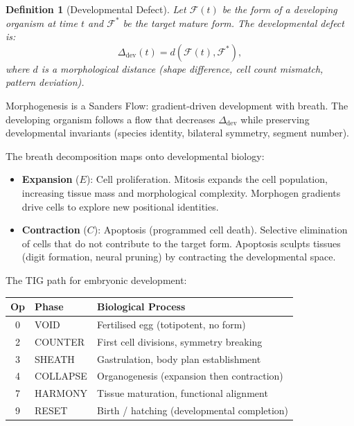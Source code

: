 \documentclass[12pt, openany]{book}
\newtheorem{definition}[theorem]{Definition}
\theoremstyle{remark}
\begin{document}
\begin{definition}[Developmental Defect]
\label{def:dev-defect}
Let $\mathcal{F}(t)$ be the form of a developing organism at time $t$ and
$\mathcal{F}^*$ be the target mature form.  The developmental defect is:
\[
  \Delta_{\mathrm{dev}}(t) = d(\mathcal{F}(t), \mathcal{F}^*),
\]
where $d$ is a morphological distance (shape difference, cell count mismatch,
pattern deviation).
\end{definition}

\noindent
Morphogenesis is a Sanders Flow: gradient-driven development with breath.  The
developing organism follows a flow that decreases $\Delta_{\mathrm{dev}}$ while
preserving developmental invariants (species identity, bilateral symmetry,
segment number).

The breath decomposition maps onto developmental biology:
\begin{itemize}
  \item \textbf{Expansion} ($E$): Cell proliferation.  Mitosis expands the cell
        population, increasing tissue mass and morphological complexity.
        Morphogen gradients drive cells to explore new positional identities.
  \item \textbf{Contraction} ($C$): Apoptosis (programmed cell death).  Selective
        elimination of cells that do not contribute to the target form.
        Apoptosis sculpts tissues (digit formation, neural pruning) by
        contracting the developmental space.
\end{itemize}

\noindent
The TIG path for embryonic development:
\begin{center}
\begin{tabular}{@{}cll@{}}
\toprule
Op & Phase & Biological Process \\
\midrule
0 & VOID & Fertilised egg (totipotent, no form) \\
2 & COUNTER & First cell divisions, symmetry breaking \\
3 & SHEATH & Gastrulation, body plan establishment \\
4 & COLLAPSE & Organogenesis (expansion then contraction) \\
7 & HARMONY & Tissue maturation, functional alignment \\
9 & RESET & Birth / hatching (developmental completion) \\
\bottomrule
\end{tabular}
\end{center}
\end{document}
